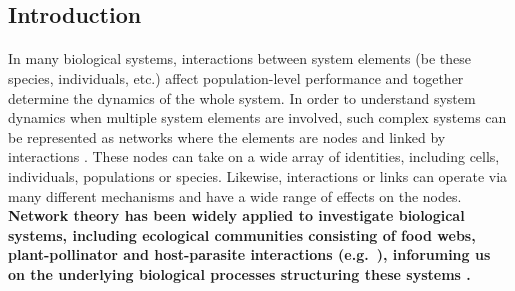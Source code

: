 \documentclass[a4,12pt]{article}
\begin{document}
\begin{refsection}

\section{Introduction}

    
    \paragraph{}
    In many biological systems, interactions between system elements (be these species, individuals, etc.) affect population-level performance and together determine the dynamics of the whole system. In order to understand system dynamics when multiple system elements are involved, such complex systems can be represented as networks where the elements are nodes and linked by interactions \parencite{Pimm1978}. These nodes can take on a wide array of identities, including cells, individuals, populations or species. Likewise, interactions or links can operate via many different mechanisms and have a wide range of effects on the nodes. \textbf{Network theory has been widely applied to investigate biological systems, including ecological communities consisting of food webs, plant-pollinator and host-parasite interactions (e.g.\ \cite{Lafferty2008, Stouffer2014, Cirtwill2015a}), inforuming us on the underlying biological processes structuring these systems \parencite{Dunne2002, Thompson2012}.}




\end{refsection}
\end{document}
